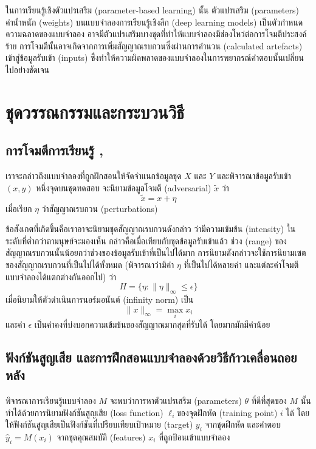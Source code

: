 \documentclass{cpepaper}
\begin{document}
ในการเรียนรู้เชิงตัวแปรเสริม (parameter-based learning) นั้น ตัวแปรเสริม (parameters) ค่าน้ำหนัก (weights) บนแบบจำลองการเรียนรู้เชิงลึก (deep learning models) เป็นตัวกำหนดความฉลาดของแบบจำลอง อาจมีตัวแปรเสริมบางชุดที่ทำให้แบบจำลองมีช่องโหว่ต่อการโจมตีประสงค์ร้าย การโจมตีนั้นอาจเกิดจากการเพิ่มสัญญาณรบกวนซึ่งผ่านการคำนวน (calculated artefacts) เข้าสู่ข้อมูลรับเข้า (inputs) ซึ่งทำให้ความผิดพลาดของแบบจำลองในการพยากรณ์คำตอบนั้นเปลี่ยนไปอย่างชัดเจน

\section{ชุดวรรณกรรมและกระบวนวิธี}

\subsection{การโจมตีการเรียนรู้ \cite{Goodfellow-et-al-2016}, \cite{kolter_madry}}

เราจะกล่าวถึงแบบจำลองที่ถูกฝึกสอนให้จัดจำแนกข้อมูลชุด $X$ และ $Y$ และพิจารณาข้อมูลรับเข้า $(x, y)$ หนึ่งจุดบนชุดทดสอบ จะนิยามข้อมูลโจมตี (adversarial) $\tilde{x}$ ว่า
\begin{equation}
    \tilde{x} = x + \eta
\end{equation}
เมื่อเรียก $\eta$ ว่าสัญญาณรบกวน (perturbations)

ข้อสังเกตที่เกิดขึ้นคือเราอาจะนิยามชุดสัญญาณรบกวนดังกล่าว ว่ามีความเข้มข้น (intensity) ในระดับที่ต่ำกว่าตามนุษย์จะมองเห็น กล่าวคือเมื่อเทียบกับชุดข้อมูลรับเข้าแล้ว ช่วง (range) ของสัญญาณรบกวนนั้นน้อยกว่าช่วงของข้อมูลรับเข้าที่เป็นไปได้มาก การนิยามดังกล่าวจะใช้การนิยามเซตของสัญญาณรบกวนที่เป็นไปได้ทั้งหมด (พิจารณาว่ามีค่า $\eta$ ที่เป็นไปได้หลายค่า และแต่ละค่าโจมตีแบบจำลองได้แตกต่างกันออกไป) ว่า
\begin{equation}
    H = \{ \eta: \|\eta\|_\infty \leq \epsilon\}
    \label{perturbation-set}
\end{equation}
เมื่อนิยามให้ตัวดำเนินการนอร์มอนันต์ (infinity norm) เป็น
\begin{equation}
    \|x\|_\infty = \max_i{x_i}
\end{equation}
และค่า $\epsilon$ เป็นค่าคงที่บ่งบอกความเข้มข้นของสัญญาณมากสุดที่รับได้ โดยมากมักมีค่าน้อย

\subsection{ฟังก์ชันสูญเสีย และการฝึกสอนแบบจำลองด้วยวิธีก้าวเคลื่อนถอยหลัง}
พิจารณาการเรียนรู้แบบจำลอง $M$ จะพบว่าการหาตัวแปรเสริม (parameters) $\theta$ ที่ดีที่สุดของ $M$ นั้นทำได้ด้วยการนิยามฟังก์ชันสูญเสีย (loss function) $\ell_i $ของจุดฝึกหัด (training point) $i$ ได้ โดยให้ฟังก์ชันสูญเสียเป็นฟังก์ชันที่เปรียบเทียบเป้าหมาย (target) $y_i$ จากชุดฝึกหัด และคำตอบ $\hat{y}_i = M(x_i)$ จากชุดคุณสมบัติ (features) $x_i$ ที่ถูกป้อนเข้าแบบจำลอง
\end{document}
